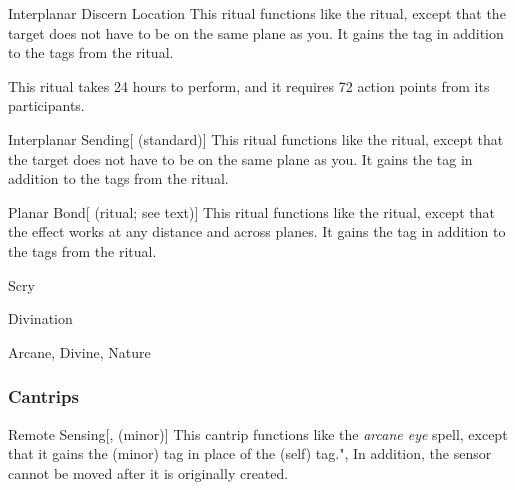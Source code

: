 \lowercase{\hypertarget{spell:Interplanar Discern Location}{}}\label{spell:Interplanar Discern Location}
\begin{freeability}[\nth{6}]{\hypertarget{spell:Interplanar Discern Location}{Interplanar Discern Location}}
This ritual functions like the  ritual, except that the target does not have to be on the same plane as you.
It gains the  tag in addition to the tags from the  ritual.

This ritual takes 24 hours to perform, and it requires 72 action points from its participants.
\end{freeability}
\vspace{0.25em}



\lowercase{\hypertarget{spell:Interplanar Sending}{}}\label{spell:Interplanar Sending}
\begin{freeability}[\nth{6}]{\hypertarget{spell:Interplanar Sending}{Interplanar Sending}}[ (standard)]
This ritual functions like the  ritual, except that the target does not have to be on the same plane as you.
It gains the  tag in addition to the tags from the  ritual.
\end{freeability}
\vspace{0.25em}



\lowercase{\hypertarget{spell:Planar Bond}{}}\label{spell:Planar Bond}
\begin{attuneability}[\nth{7}]{\hypertarget{spell:Planar Bond}{Planar Bond}}[ (ritual; see text)]
This ritual functions like the  ritual, except that the effect works at any distance and across planes.
It gains the  tag in addition to the tags from the  ritual.
\end{attuneability}
\vspace{0.25em}


\newpage
\begin{spellsection}{Scry}

\begin{spellheader}
\end{spellheader}


 Divination

 Arcane, Divine, Nature

\subsubsection{Cantrips}


\begin{apability}{Remote Sensing}[,  (minor)]
This cantrip functions like the \textit{arcane eye} spell, except that it gains the  (minor) tag in place of the  (self) tag.",
In addition, the sensor cannot be moved after it is originally created.
\end{apability}

\end{spellsection}


